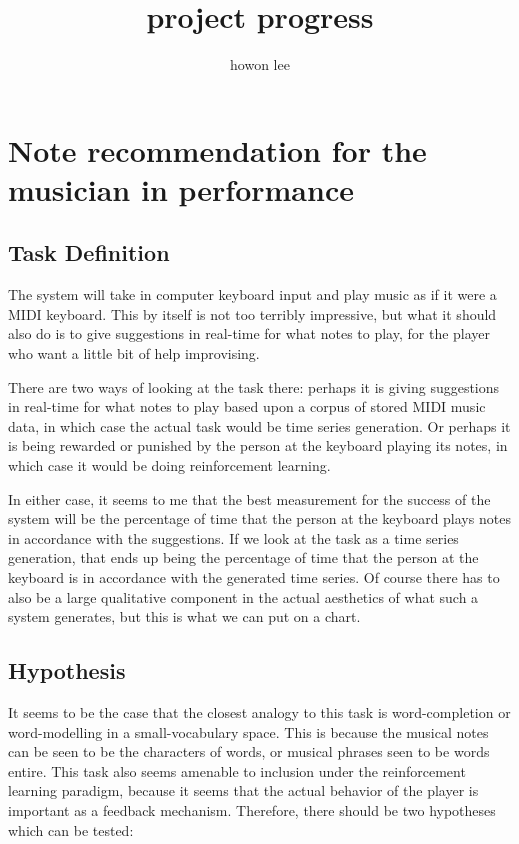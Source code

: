 \documentclass{article}
\begin{document}
\title{project progress}
\author{howon lee}
\maketitle
\section*{Note recommendation for the musician in performance}

\subsection*{Task Definition}
The system will take in computer keyboard input and play music as if it were a MIDI keyboard. This by itself is not too terribly impressive, but what it should also do is to give suggestions in real-time for what notes to play, for the player who want a little bit of help improvising.

There are two ways of looking at the task there: perhaps it is giving suggestions in real-time for what notes to play based upon a corpus of stored MIDI music data, in which case the actual task would be time series generation. Or perhaps it is being rewarded or punished by the person at the keyboard playing its notes, in which case it would be doing reinforcement learning.

In either case, it seems to me that the best measurement for the success of the system will be the percentage of time that the person at the keyboard plays notes in accordance with the suggestions. If we look at the task as a time series generation, that ends up being the percentage of time that the person at the keyboard is in accordance with the generated time series. Of course there has to also be a large qualitative component in the actual aesthetics of what such a system generates, but this is what we can put on a chart. 

\subsection*{Hypothesis}
It seems to be the case that the closest analogy to this task is word-completion or word-modelling in a small-vocabulary space. This is because the musical notes can be seen to be the characters of words, or musical phrases seen to be words entire. This task also seems amenable to inclusion under the reinforcement learning paradigm, because it seems that the actual behavior of the player is important as a feedback mechanism. Therefore, there should be two hypotheses which can
be tested:
\end{document}
